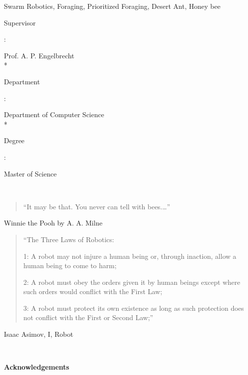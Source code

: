  Swarm Robotics, Foraging, Prioritized Foraging, Desert Ant, Honey bee

\vfill
\noindent
{\bf\parbox{26.8mm}{Supervisor}:} Prof. A. P. Engelbrecht \\* %
{\bf\parbox{26.8mm}{Department}:} Department of Computer Science \\*
{\bf\parbox{26.8mm}{Degree}:} Master of Science


\newpage

\ 

\begin{quotation}
``It may be that. You never can tell with bees.\ldots''
\end{quotation}
\begin{flushright}
Winnie the Pooh by A. A. Milne
\end{flushright}

\vspace{1cm}

\begin{quotation}
``The Three Laws of Robotics:

1: A robot may not injure a human being or, through inaction, allow a human being to come to harm;

2: A robot must obey the orders given it by human beings except where such orders would conflict with the First Law;

3: A robot must protect its own existence as long as such protection does not conflict with the First or Second Law;''
\end{quotation}
\begin{flushright}
Isaac Asimov, I, Robot
\end{flushright}


\ 


\newpage

\begin{center}{\Large\bf Acknowledgements}\end{center}

\vspace{0.3cm}

